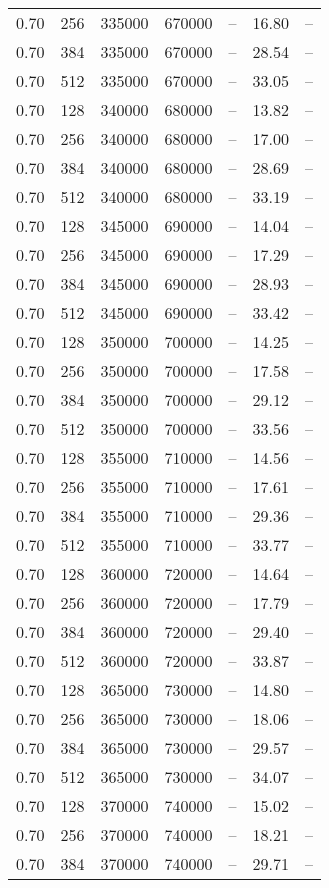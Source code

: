 \begin{tabular}{l|l|l|l|l|l|l}
0.70 & 256 & 335000 & 670000 & -- & 16.80 & --\\
0.70 & 384 & 335000 & 670000 & -- & 28.54 & --\\
0.70 & 512 & 335000 & 670000 & -- & 33.05 & --\\
0.70 & 128 & 340000 & 680000 & -- & 13.82 & --\\
0.70 & 256 & 340000 & 680000 & -- & 17.00 & --\\
0.70 & 384 & 340000 & 680000 & -- & 28.69 & --\\
0.70 & 512 & 340000 & 680000 & -- & 33.19 & --\\
0.70 & 128 & 345000 & 690000 & -- & 14.04 & --\\
0.70 & 256 & 345000 & 690000 & -- & 17.29 & --\\
0.70 & 384 & 345000 & 690000 & -- & 28.93 & --\\
0.70 & 512 & 345000 & 690000 & -- & 33.42 & --\\
0.70 & 128 & 350000 & 700000 & -- & 14.25 & --\\
0.70 & 256 & 350000 & 700000 & -- & 17.58 & --\\
0.70 & 384 & 350000 & 700000 & -- & 29.12 & --\\
0.70 & 512 & 350000 & 700000 & -- & 33.56 & --\\
0.70 & 128 & 355000 & 710000 & -- & 14.56 & --\\
0.70 & 256 & 355000 & 710000 & -- & 17.61 & --\\
0.70 & 384 & 355000 & 710000 & -- & 29.36 & --\\
0.70 & 512 & 355000 & 710000 & -- & 33.77 & --\\
0.70 & 128 & 360000 & 720000 & -- & 14.64 & --\\
0.70 & 256 & 360000 & 720000 & -- & 17.79 & --\\
0.70 & 384 & 360000 & 720000 & -- & 29.40 & --\\
0.70 & 512 & 360000 & 720000 & -- & 33.87 & --\\
0.70 & 128 & 365000 & 730000 & -- & 14.80 & --\\
0.70 & 256 & 365000 & 730000 & -- & 18.06 & --\\
0.70 & 384 & 365000 & 730000 & -- & 29.57 & --\\
0.70 & 512 & 365000 & 730000 & -- & 34.07 & --\\
0.70 & 128 & 370000 & 740000 & -- & 15.02 & --\\
0.70 & 256 & 370000 & 740000 & -- & 18.21 & --\\
0.70 & 384 & 370000 & 740000 & -- & 29.71 & --\\

\end{tabular}
